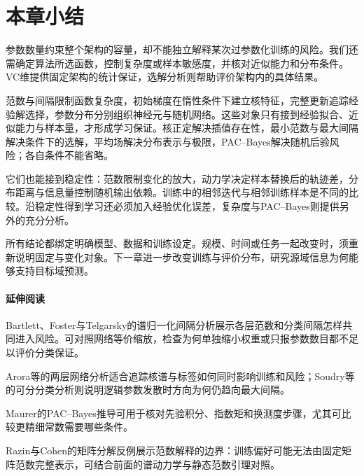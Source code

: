\FloatBarrier
{}
\section{本章小结}
\label{sec:deep-learning-summary}

参数数量约束整个架构的容量，却不能独立解释某次过参数化训练的风险。我们还需确定算法所选函数，控制复杂度或样本敏感度，并核对近似能力和分布条件。VC维提供固定架构的统计保证，选解分析则帮助评价架构内的具体结果。

范数与间隔限制函数复杂度，初始梯度在惰性条件下建立核特征，完整更新追踪经验解选择，参数分布分别组织神经元与随机网络。这些对象只有接到经验拟合、近似能力与样本量，才形成学习保证。核正定解决插值存在性，最小范数与最大间隔解决条件下的选解，平均场解决分布表示与极限，PAC--Bayes解决随机后验风险；各自条件不能省略。

它们也能接到稳定性：范数限制变化的放大，动力学决定样本替换后的轨迹差，分布距离与信息量控制随机输出依赖。训练中的相邻迭代与相邻训练样本是不同的比较。沿稳定性得到学习还必须加入经验优化误差，复杂度与PAC--Bayes则提供另外的充分分析。

所有结论都绑定明确模型、数据和训练设定。规模、时间或任务一起改变时，须重新说明固定与变化对象。下一章进一步改变训练与评价分布，研究源域信息为何能够支持目标域预测。

\paragraph{延伸阅读}
Bartlett、Foster与Telgarsky的谱归一化间隔分析展示各层范数和分类间隔怎样共同进入风险。可对照网络等价缩放，检查为何单独缩小权重或只报参数数目都不足以评价分类保证。

Arora等的两层网络分析适合追踪核谱与标签如何同时影响训练和风险；Soudry等的可分分类分析则说明逻辑参数发散时方向为何仍趋向最大间隔。

Maurer的PAC--Bayes推导可用于核对先验积分、指数矩和换测度步骤，尤其可比较更精细常数需要哪些条件。

Razin与Cohen的矩阵分解反例展示范数解释的边界：训练偏好可能无法由固定矩阵范数完整表示，可结合前面的谱动力学与静态范数引理对照。